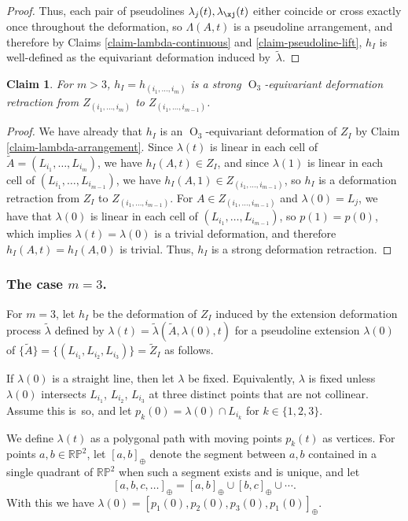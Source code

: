\documentclass[JEP,XML,SOM,Unicode,NoFloatCountersInSection,published]{cedram}
\newtheorem{claim}[theorem]{Claim}
\theoremstyle{remark}
\let\mb\mathbb
\DeclareMathOperator{\orth}{O}
\newcommand{\projplane}{\mb{RP}^2}
\begin{document}
\begin{proof}
Thus, each pair of pseudolines $\lambda_j(t),\lambda_\xj(t)$ either coincide or cross exactly once throughout the deformation, so $\Lambda(A,t)$ is a pseudoline arrangement, and therefore by Claims \ref{claim-lambda-continuous} and \ref{claim-pseudoline-lift}, $h_I$ is well-defined as the equivariant deformation induced by~$\tilde\lambda$.
\end{proof}

\begin{claim}\label{claim-deform-h}
For $m >3$, $h_I = h_{(i_1,\dots,i_m)}$ is a strong $\orth_3$-equivariant deformation retraction from $Z_{(i_1,\dots,i_m)}$ to $Z_{(i_1,\dots,i_{m-1})}$.
\end{claim}

\begin{proof}
We have already that $h_I$ is an $\orth_3$-equivariant deformation of $Z_I$ by Claim \ref{claim-lambda-arrangement}.
Since $\lambda(t)$ is linear in each cell of $\tilde A = (L_{i_1},\dots,L_{i_{m}})$, we have $h_I(A,t) \in Z_I$,
and since $\lambda(1)$ is linear in each cell of $(L_{i_1},\dots,L_{i_{m-1}})$, we have $h_I(A,1) \in Z_{(i_1,\dots,i_{m-1})}$,
so $h_I$ is a deformation retraction from $Z_I$ to $Z_{(i_1,\dots,i_{m-1})}$.
For $A \in Z_{(i_1,\dots,i_{m-1})}$ and $\lambda(0) = L_j$, we have that $\lambda(0)$ is linear in each cell of $(L_{i_1},\dots,L_{i_{m-1}})$, so $p(1) = p(0)$, which implies $\lambda(t) = \lambda(0)$ is a trivial deformation, and therefore $h_I(A,t) = h_I(A,0)$ is trivial. Thus, $h_I$ is a strong deformation retraction.
\end{proof}

\subsubsection*{The case $m=3$.}
For $m=3$, let $h_I$ be the deformation of $Z_I$ induced by the extension deformation process $\tilde \lambda$ defined by $\lambda(t) = \tilde \lambda(\tilde A, \lambda(0), t)$
for a pseudoline extension $\lambda(0)$ of $\{\tilde A\} = \{(L_{i_1},L_{i_2},L_{i_3})\} = \tilde Z_{I}$ as follows.

If $\lambda(0)$ is a straight line,
then let $\lambda$ be fixed.
Equivalently, $\lambda$ is fixed unless $\lambda(0)$ intersects $L_{i_1}$, $L_{i_2}$, $L_{i_3}$ at three distinct points that are not collinear.
Assume this is~so, and let $p_k(0) = \lambda(0) \cap L_{i_k}$ for $k \in \{1,2,3\}$.

We define $\lambda(t)$ as a polygonal path with moving points $p_k(t)$ as vertices.
For points $a,b \in \projplane$, let $[a,b]_\oplus$ denote the segment between $a,b$ contained in a single quadrant of $\projplane$ when such a segment exists and is unique, and let
\[
[a,b,c,\dots]_\oplus = [a,b]_\oplus \cup [b,c]_\oplus \cup \cdots.
\]
With this we have $\lambda(0) = [p_1(0),p_2(0),p_3(0),p_1(0)]_{\oplus}$.
\end{document}
